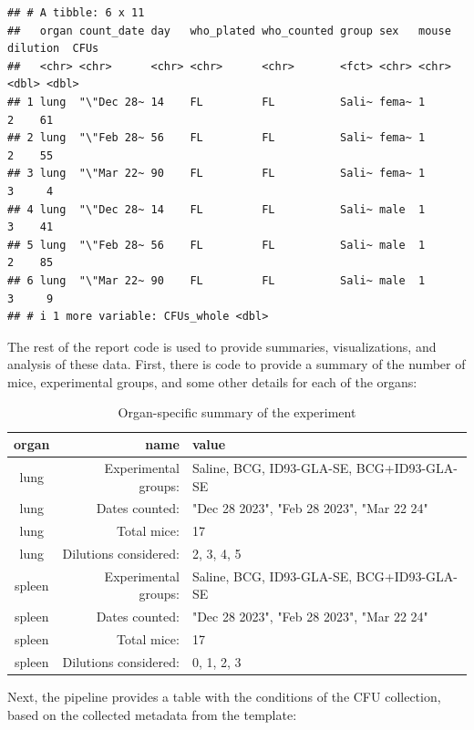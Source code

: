 \documentclass[
]{book}
\begin{document}
\begin{verbatim}
## # A tibble: 6 x 11
##   organ count_date day   who_plated who_counted group sex   mouse dilution  CFUs
##   <chr> <chr>      <chr> <chr>      <chr>       <fct> <chr> <chr>    <dbl> <dbl>
## 1 lung  "\"Dec 28~ 14    FL         FL          Sali~ fema~ 1            2    61
## 2 lung  "\"Feb 28~ 56    FL         FL          Sali~ fema~ 1            2    55
## 3 lung  "\"Mar 22~ 90    FL         FL          Sali~ fema~ 1            3     4
## 4 lung  "\"Dec 28~ 14    FL         FL          Sali~ male  1            3    41
## 5 lung  "\"Feb 28~ 56    FL         FL          Sali~ male  1            2    85
## 6 lung  "\"Mar 22~ 90    FL         FL          Sali~ male  1            3     9
## # i 1 more variable: CFUs_whole <dbl>
\end{verbatim}

The rest of the report code is used to provide summaries, visualizations, and
analysis of these data. First, there is code to provide a summary of the number
of mice, experimental groups, and some other details for each of the organs:

\begin{table}

\caption{\label{tab:unnamed-chunk-30}Organ-specific summary of the experiment}
\centering
\begin{tabular}[t]{c|r|l}
\hline
organ & name & value\\
\hline
lung & Experimental groups: & Saline, BCG, ID93-GLA-SE, BCG+ID93-GLA-SE\\
\hline
lung & Dates counted: & "Dec 28 2023", "Feb 28 2023", "Mar 22 24"\\
\hline
lung & Total mice: & 17\\
\hline
lung & Dilutions considered: & 2, 3, 4, 5\\
\hline
spleen & Experimental groups: & Saline, BCG, ID93-GLA-SE, BCG+ID93-GLA-SE\\
\hline
spleen & Dates counted: & "Dec 28 2023", "Feb 28 2023", "Mar 22 24"\\
\hline
spleen & Total mice: & 17\\
\hline
spleen & Dilutions considered: & 0, 1, 2, 3\\
\hline
\end{tabular}
\end{table}

Next, the pipeline provides a table with the conditions of the CFU collection,
based on the collected metadata from the template:
\end{document}
